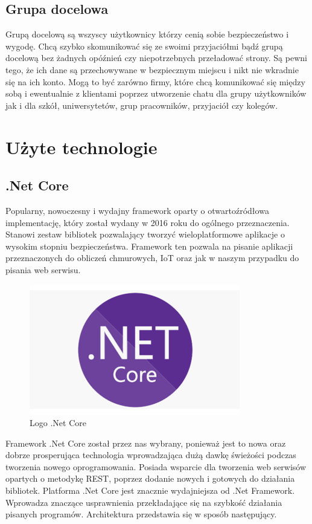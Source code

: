 \documentclass[12pt,a4paper]{article}
\begin{document}
\subsection{Grupa docelowa}
\hspace*{0.7cm} Grupą docelową są wszyscy użytkownicy którzy cenią sobie bezpieczeństwo i wygodę. Chcą szybko skomunikować się ze swoimi przyjaciółmi bądź grupą docelową
bez żadnych opóźnień czy niepotrzebnych przeładować strony. Są pewni tego, że ich dane są przechowywane w bezpiecznym miejscu i nikt nie wkradnie się na ich
konto. Mogą to być zarówno firmy, które chcą komunikować się między sobą i ewentualnie z klientami poprzez utworzenie chatu dla grupy użytkowników jak i dla szkół, uniwersytetów, grup pracowników, przyjaciół czy kolegów. 


\section{Użyte technologie}

\subsection{.Net Core} 			%
\hspace*{0.7cm} Popularny, nowoczesny i wydajny framework oparty o otwartoźródłowa implementację, który został wydany w 2016 roku do ogólnego przeznaczenia. Stanowi zestaw bibliotek pozwalający tworzyć wieloplatformowe aplikacje o wysokim stopniu bezpieczeństwa. Framework ten pozwala na pisanie aplikacji przeznaczonych do obliczeń chmurowych, IoT oraz jak w naszym przypadku do pisania web serwisu. 

\begin{figure}[h]
	\centering
	\includegraphics[width=0.3\linewidth]{dotnet5_platform}
	\caption{Logo .Net Core}
	\label{fig:dotnet5platform}
\end{figure}

Framework .Net Core został przez nas wybrany, ponieważ jest to nowa oraz dobrze prosperująca technologia wprowadzająca dużą dawkę świeżości podczas tworzenia nowego oprogramowania. Posiada wsparcie dla tworzenia web serwisów opartych o metodykę REST, poprzez dodanie nowych i gotowych do działania bibliotek. Platforma .Net Core jest znacznie wydajniejsza od .Net Framework. Wprowadza znaczące usprawnienia przekładające się na szybkość działania pisanych programów. Architektura przedstawia się w sposób następujący.\newline
\end{document}
